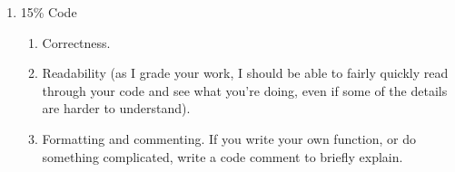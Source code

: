\documentclass[12pt]{article}
\begin{document}
\begin{enumerate}
\begin{enumerate}
	\end{enumerate}
	\item 15\% Code
	\begin{enumerate}
		\item Correctness.
		\item Readability (as I grade your work, I should be able to fairly quickly read through your code and see what you're doing, even if some of the details are harder to understand).
		\item Formatting and commenting. If you write your own function, or do something complicated, write a code comment to briefly explain.
	\end{enumerate}
\end{enumerate}
\end{document}
